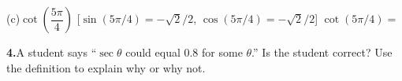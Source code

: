 \documentclass[10pt]{article}
\begin{document}
\begin{tcolorbox}[colback=white, colframe=black!40,
    title=\textbf{Tier A --- Apply},
    fonttitle=\bfseries, arc=2mm, left=3mm, right=3mm, top=2mm, bottom=2mm]
\vspace{6pt}
(c)\quad $\cot\!\left(\dfrac{5\pi}{4}\right)$
\hspace{0.4cm} [$\sin(5\pi/4) = -\sqrt{2}/2$, $\cos(5\pi/4) = -\sqrt{2}/2$]
\hspace{0.5cm} $\cot(5\pi/4) = $ \underline{\hspace{2.5cm}}

\vspace{8pt}
\textbf{4.}\quad A student says ``$\sec\theta$ could equal 0.8 for some $\theta$.''
Is the student correct? Use the definition to explain why or why not.


\end{tcolorbox}

\vspace{0.08in}
\end{document}

